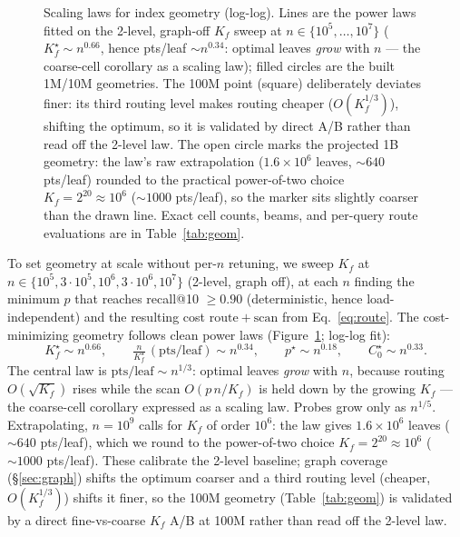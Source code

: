 \documentclass{article}
\begin{document}
\begin{figure}[t]
\caption{Scaling laws for index geometry (log-log). Lines are the power laws fitted
on the 2-level, graph-off $K_f$ sweep at $n\in\{10^5,\dots,10^7\}$
($K_f^\star\sim n^{0.66}$, hence pts/leaf $\sim n^{0.34}$: optimal leaves \emph{grow}
with $n$ --- the coarse-cell corollary as a scaling law); filled circles are the built
1M/10M geometries. The 100M point (square) deliberately deviates finer: its third
routing level makes routing cheaper ($O(K_f^{1/3})$), shifting the optimum, so it is
validated by direct A/B rather than read off the 2-level law. The open circle marks
the projected 1B geometry: the law's raw extrapolation ($1.6{\times}10^6$ leaves,
${\sim}640$ pts/leaf) rounded to the practical power-of-two choice
$K_f{=}2^{20}\!\approx\!10^6$ (${\sim}1000$ pts/leaf), so the marker sits slightly
coarser than the drawn line. Exact cell counts,
beams, and per-query route evaluations are in Table~\ref{tab:geom}.}
\label{fig:scaling}
\end{figure}

To set geometry at scale without per-$n$ retuning, we sweep $K_f$ at
$n\in\{10^5,3{\cdot}10^5,10^6,3{\cdot}10^6,10^7\}$ (2-level, graph off), at each $n$
finding the minimum $p$ that reaches recall@10 $\ge 0.90$ (deterministic, hence
load-independent) and the resulting cost $\mathrm{route}+\mathrm{scan}$ from
Eq.~\eqref{eq:route}. The cost-minimizing geometry follows clean power laws (Figure~\ref{fig:scaling};
log-log fit):
\[
K_f^\star \sim n^{0.66},\qquad
\tfrac{n}{K_f^\star}\,(\text{pts/leaf}) \sim n^{0.34},\qquad
p^\star \sim n^{0.18},\qquad
C_0^\star \sim n^{0.33}.
\]
The central law is $\text{pts/leaf}\sim n^{1/3}$: optimal leaves \emph{grow} with $n$,
because routing $O(\sqrt{K_f})$ rises while the scan $O(p\,n/K_f)$ is held down by the
growing $K_f$ --- the coarse-cell corollary expressed as a scaling law. Probes grow
only as $n^{1/5}$. Extrapolating, $n{=}10^9$ calls for $K_f$ of order $10^6$: the law gives
$1.6{\times}10^6$ leaves (${\sim}640$ pts/leaf), which we round to the
power-of-two choice $K_f{=}2^{20}\!\approx\!10^6$ (${\sim}1000$ pts/leaf). These calibrate the 2-level baseline; graph coverage
(\S\ref{sec:graph}) shifts the optimum coarser and a third routing level (cheaper,
$O(K_f^{1/3})$) shifts it finer, so the 100M geometry (Table~\ref{tab:geom}) is validated
by a direct fine-vs-coarse $K_f$ A/B at 100M rather than read off the 2-level law.
\end{document}
